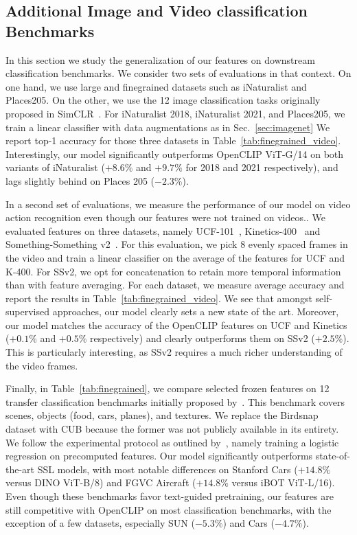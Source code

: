 \subsection{Additional Image and Video classification Benchmarks} In this section we study the generalization of our features on downstream classification benchmarks. We consider two sets of evaluations in that context. On one hand, we use large and finegrained datasets such as iNaturalist and Places205. On the other, we use the 12 image classification tasks originally proposed in SimCLR~\citep{chen2020simple}. For iNaturalist 2018, iNaturalist 2021, and Places205, we train a linear classifier with data augmentations as in Sec.~\ref{sec:imagenet}
We report top-1 accuracy for those three datasets in Table~\ref{tab:finegrained_video}.
Interestingly, our model significantly outperforms OpenCLIP ViT-G/14 on both variants of iNaturalist ($+8.6\%$ and $+9.7\%$ for 2018 and 2021 respectively), and lags slightly behind on Places 205 ($-2.3\%$).

In a second set of evaluations, we measure the performance of our model on video action recognition even though our features were not trained on videos.. We evaluated features on three datasets, namely UCF-101~\citep{soomro2012ucf101}, Kinetics-400~\citep{kay2017kinetics} and Something-Something v2~\citep{goyal2017something}. For this evaluation, we pick $8$ evenly spaced frames in the video and train a linear classifier on the average of the features for UCF and K-400. For SSv2, we opt for concatenation to retain more temporal information than with feature averaging. For each dataset, we measure average accuracy and report the results in Table~\ref{tab:finegrained_video}.
We see that amongst self-supervised approaches, our model clearly sets a new state of the art. Moreover, our model matches the accuracy of the OpenCLIP features on UCF and Kinetics ($+0.1\%$ and $+0.5\%$ respectively) and clearly outperforms them on SSv2 ($+2.5\%$).
This is particularly interesting, as SSv2 requires a much richer understanding of the video frames.

Finally, in Table~\ref{tab:finegrained}, we compare selected frozen features on 12 transfer classification benchmarks initially proposed by~\citet{chen2020simple}.
This benchmark covers scenes, objects (food, cars, planes), and textures. We replace the Birdsnap dataset with CUB because the former was not publicly available in its entirety. We follow the experimental protocol as outlined by~\citet{chen2020simple}, namely training a logistic regression on precomputed features. Our model significantly outperforms state-of-the-art SSL models, with most notable differences on Stanford Cars ($+14.8\%$ versus DINO ViT-B/8) and FGVC Aircraft ($+14.8\%$ versus iBOT ViT-L/16). Even though these benchmarks favor text-guided pretraining, our features are still competitive with OpenCLIP on most classification benchmarks, with the exception of a few datasets, especially SUN ($-5.3\%$) and Cars ($-4.7\%$).

